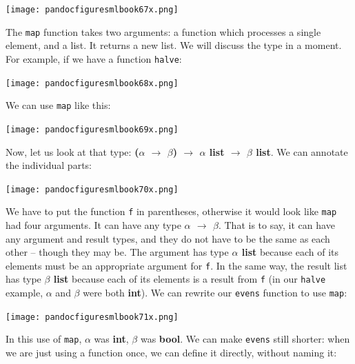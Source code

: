 \documentclass[]{book}
\begin{document}
\medskip
\begin{center}
\noindent\texttt{[image: pandocfiguresmlbook67x.png]}
\end{center}
\medskip

\noindent The \texttt{map} function takes two arguments: a function which processes a single element, and a list. It returns a new list. We will discuss the type in a moment. For example, if we have a function \texttt{halve}:

\medskip
\begin{center}
\noindent\texttt{[image: pandocfiguresmlbook68x.png]}
\end{center}
\medskip

\noindent We can use \texttt{map} like this:

\medskip
\begin{center}
\noindent\texttt{[image: pandocfiguresmlbook69x.png]}
\end{center}
\medskip

\noindent Now, let us look at that type: \textbf{\textsf{\textmd{(}$\alpha$ $\rightarrow$ $\beta$\textmd{)} $\rightarrow$ $\alpha$ list $\rightarrow$ $\beta$ list}}. We can annotate the individual parts:

\medskip
\begin{center}
\noindent\texttt{[image: pandocfiguresmlbook70x.png]}
\end{center}
\medskip

\noindent We have to put the function \texttt{f} in parentheses, otherwise it would look like \texttt{map} had four arguments. It can have any type \textbf{\textsf{$\alpha$ $\rightarrow$ $\beta$}}. That is to say, it can have any argument and result types, and they do not have to be the same as each other -- though they may be.  The argument has type \textbf{\textsf{$\alpha$ list}} because each of its elements must be an appropriate argument for \texttt{f}. In the same way, the result list has type \textbf{\textsf{$\beta$ list}} because each of its elements is a result from \texttt{f} (in our \texttt{halve} example, $\alpha$ and $\beta$ were both \textbf{\textsf{int}}). We can rewrite our \texttt{evens} function to use \texttt{map}:

\medskip
\begin{center}
\noindent\texttt{[image: pandocfiguresmlbook71x.png]}
\end{center}
\medskip

\noindent In this use of \texttt{map}, $\alpha$ was \textbf{\textsf{int}}, $\beta$ was \textbf{\textsf{bool}}. We can make \texttt{evens} still shorter: when we are just using a function once, we can define it directly, without naming it:
\end{document}
